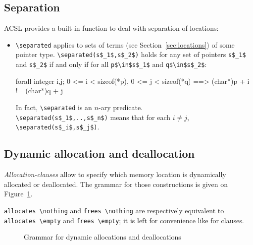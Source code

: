 \subsection{Separation}\label{sec:separated} 

ACSL provides a built-in function to deal with separation of locations:

\begin{itemize}
\item \lstinline|\separated|
applies to sets of terms (see Section~\ref{sec:locations}) of some pointer type. 
\lstinline|\separated(s$_1$,s$_2$)|
holds for any set of pointers \lstinline|s$_1$| and \lstinline|s$_2$| 
if and only if for all \lstinline|p$\in$s$_1$| and \lstinline|q$\in$s$_2$|:
\begin{listing-nonumber}
  forall integer i,j; 0 <= i < sizeof(*p), 0 <= j < sizeof(*q)
     ==>  (char*)p + i != (char*)q + j 
\end{listing-nonumber}

In fact, \lstinline|\separated| is an $n$-ary predicate.\\
\lstinline|\separated(s$_1$,..,s$_n$)| means
that for each
$i\neq j$, \lstinline|\separated(s$_i$,s$_j$)|.
\end{itemize}


\subsection{Dynamic allocation and deallocation}
\label{sec:allocation-clause}

\experimental

\textsl{Allocation-clauses} allow to specify which memory location 
is dynamically allocated or deallocated.
The grammar for those constructions is given on Figure~\ref{fig:gram:allocation}.

\lstinline|allocates \nothing| and \lstinline|frees \nothing| are respectively 
equivalent to \lstinline|allocates \empty| and \lstinline|frees \empty|; 
it is left for convenience like for \assigns clauses.

\begin{figure}[t]
  \begin{cadre}
      
    \end{cadre}
  \caption{Grammar for dynamic allocations and deallocations}
\label{fig:gram:allocation}
\end{figure}


